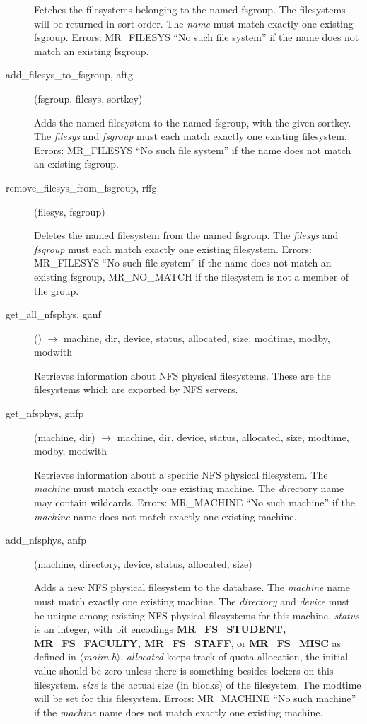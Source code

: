 \documentclass{article}
\begin{document}
\begin{description}
Fetches the filesystems belonging to the named fsgroup.  The
filesystems will be returned in sort order.  The {\em name} must match
exactly one existing fsgroup.  Errors: MR\_FILESYS ``No such file
system'' if the name does not match an existing fsgroup.

\item[add\_filesys\_to\_fsgroup, aftg](fsgroup, filesys, sortkey)

Adds the named filesystem to the named fsgroup, with the given
sortkey.  The {\em filesys} and {\em fsgroup} must each match exactly one
existing filesystem.  Errors: MR\_FILESYS ``No such file system'' if the
name does not match an existing fsgroup.

\item[remove\_filesys\_from\_fsgroup, rffg](filesys, fsgroup)

Deletes the named filesystem from the named fsgroup.  The {\em filesys}
and {\em fsgroup} must each match exactly one existing filesystem.
Errors: MR\_FILESYS ``No such file system'' if the name does not match
an existing fsgroup, MR\_NO\_MATCH if the filesystem is not a member of
the group.

\item[get\_all\_nfsphys, ganf]() $\rightarrow$ machine, dir, device, status,
allocated, size, modtime, modby, modwith

Retrieves information about NFS physical filesystems.  These are the
filesystems which are exported by NFS servers.

\item[get\_nfsphys, gnfp](machine, dir) $\rightarrow$ machine, dir, device,
status, allocated, size, modtime, modby, modwith

Retrieves information about a specific NFS physical filesystem.  The
{\em machine} must match exactly one existing machine.  The
{\em dir}ectory name may contain wildcards.  Errors: MR\_MACHINE ``No
such machine'' if the {\em machine} name does not match exactly one
existing machine.

\item[add\_nfsphys, anfp](machine, directory, device, status, allocated,
size)

Adds a new NFS physical filesystem to the database.  The {\em machine}
name must match exactly one existing machine.  The {\em directory} and
{\em device} must be unique among existing NFS physical filesystems for
this machine.  {\em status} is an integer, with bit encodings
{\bf MR\_FS\_STUDENT, MR\_FS\_FACULTY, MR\_FS\_STAFF}, or {\bf MR\_FS\_MISC}
as defined in {\em $\langle$moira.h$\rangle$}.  {\em allocated} keeps track of quota
allocation, the initial value should be zero unless there is something
besides lockers on this filesystem.  {\em size} is the actual size (in
blocks) of the filesystem.  The modtime will be set for this
filesystem.  Errors: MR\_MACHINE ``No such machine'' if the {\em machine}
name does not match exactly one existing machine.


\end{description}
\end{document}
